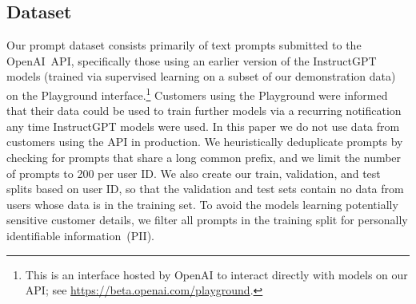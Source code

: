 \begin{table}
{\begin{tabular}{p{} p{}}
 \bottomrule
 \end{tabular}
}
\end{table}





\subsection{Dataset}
\label{sec:dataset}

Our prompt dataset consists primarily of text prompts submitted to the OpenAI~API, specifically those using an earlier version of the InstructGPT models (trained via supervised learning on a subset of our demonstration data) on the Playground interface.\footnote{This is an interface hosted by OpenAI to interact directly with models on our API; see \url{https://beta.openai.com/playground}.} 
Customers using the Playground were informed that their data could be used to train further models via a recurring notification any time InstructGPT models were used.
In this paper we do not use data from customers using the API in production. We heuristically deduplicate prompts by checking for prompts that share a long common prefix, and we limit the number of prompts to 200 per user ID.  We also create our train, validation, and test splits based on user ID, so that the validation and test sets contain no data from users whose data is in the training set.  To avoid the models learning potentially sensitive customer details, we filter all prompts in the training split for personally identifiable information~(PII).

